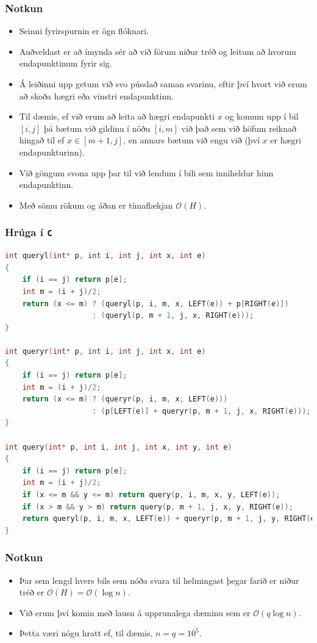 \documentclass{beamer}
\begin{document}
\begin{frame}
\frametitle{Notkun}
\begin{itemize}
\item<1-> Seinni fyrirspurnin er ögn flóknari.
\item<2-> Auðveldast er að ímynda sér að við förum niður tréð og leitum að hvorum endapunktinum fyrir sig.
\item<3-> Á leiðinni upp getum við svo pússlað saman svarinu, eftir því hvort við erum að skoða hægri eða vinstri endapunktinn.
\item<4-> Til dæmis, ef við erum að leita að hægri endapunkti $x$ og komum upp í bil $[i, j]$ þá bætum við gildinu í nóðu
$[i, m]$ við það sem við höfum reiknað hingað til ef $x \in [m + 1, j]$, en annars bætum við engu við (því $x$ er hægri endapunkturinn).
\item<5-> Við göngum svona upp þar til við lendum í bili sem inniheldur hinn endapunktinn.
\item<6-> Með sömu rökum og áðan er tímaflækjan $\mathcal{O}(H)$.
\end{itemize}
\end{frame}

\begin{frame}[fragile]
	\frametitle{Hrúga í \texttt{C}}
	\tiny
	\begin{lstlisting}[language=C]
int queryl(int* p, int i, int j, int x, int e)
{
	if (i == j) return p[e];
	int m = (i + j)/2;
	return (x <= m) ? (queryl(p, i, m, x, LEFT(e)) + p[RIGHT(e)])
                    : (queryl(p, m + 1, j, x, RIGHT(e)));
}

int queryr(int* p, int i, int j, int x, int e)
{
	if (i == j) return p[e];
	int m = (i + j)/2;
	return (x <= m) ? (queryr(p, i, m, x, LEFT(e)))
                    : (p[LEFT(e)] + queryr(p, m + 1, j, x, RIGHT(e)));
}

int query(int* p, int i, int j, int x, int y, int e)
{
	if (i == j) return p[e];
	int m = (i + j)/2;
	if (x <= m && y <= m) return query(p, i, m, x, y, LEFT(e));
	if (x > m && y > m) return query(p, m + 1, j, x, y, RIGHT(e));
	return queryl(p, i, m, x, LEFT(e)) + queryr(p, m + 1, j, y, RIGHT(e));
}
\end{lstlisting}
\end{frame}

\begin{frame}
\frametitle{Notkun}
\begin{itemize}
\item<1-> Þar sem lengd hvers bils sem nóða svara til helmingast þegar farið er niður tréð er $\mathcal{O}(H) = \mathcal{O}(\log n)$.
\item<2-> Við erum því komin með lausn á upprunalega dæminu sem er $\mathcal{O}(q \log n)$.
\item<3-> Þetta væri nógu hratt ef, til dæmis, $n = q = 10^5$.
\end{itemize}
\end{frame}
\end{document}
